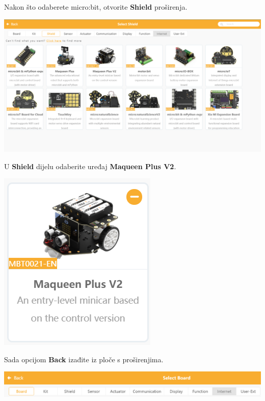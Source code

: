 \vspace{3mm}

Nakon što odaberete micro:bit, otvorite \textbf{Shield} proširenja.

\vspace{3mm}

\includegraphics[scale=0.4]{Mindplus7.png}

\vspace{3mm}

U \textbf{Shield} dijelu odaberite uređaj \textbf{Maqueen Plus V2}.

\vspace{3mm}

\includegraphics[scale=0.6]{Mindplus8.png}

\vspace{3mm}

Sada opcijom \textbf{Back} izađite iz ploče s proširenjima.

\vspace{3mm}

\includegraphics[scale=0.5]{Mindplus9.png}

